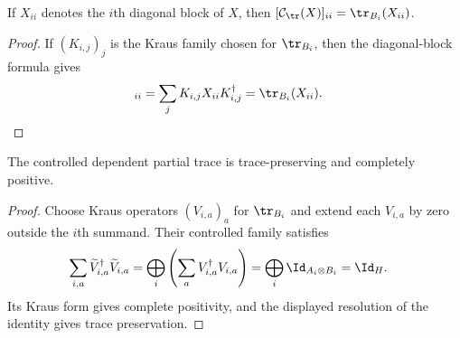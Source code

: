 \begin{theorem}
    \label{thm:controlled_dependent_partial_trace_same_block}
    \leanok
    If $X_{ii}$ denotes the $i$th diagonal block of $X$, then
    $[\mathcal C_{\tr}(X)]_{ii}=\tr_{B_i}(X_{ii})$.
\end{theorem}
\begin{proof}
    \leanok

    If $(K_{i,j})_j$ is the Kraus family chosen for $\tr_{B_i}$, then the
    diagonal-block formula gives
    \begin{align}
        [\mathcal C_{\tr}(X)]_{ii}
         & =\sum_j K_{i,j}X_{ii}K_{i,j}^\dagger
        =\tr_{B_i}(X_{ii}). \notag
    \end{align}
\end{proof}

\begin{theorem}
    \label{thm:controlled_dependent_partial_trace_cptp}
    \leanok
    The controlled dependent partial trace is trace-preserving and completely
    positive.
\end{theorem}
\begin{proof}
    \leanok

    Choose Kraus operators $(V_{i,a})_a$ for $\tr_{B_i}$ and extend each
    $V_{i,a}$ by zero outside the $i$th summand. Their controlled family
    satisfies
    \begin{align}
        \sum_{i,a}\widetilde V_{i,a}^{\dagger}\widetilde V_{i,a}
         & =\bigoplus_i\left(\sum_aV_{i,a}^{\dagger}V_{i,a}\right)
        =\bigoplus_i \Id_{A_i\otimes B_i}
        =\Id_H. \notag
    \end{align}
    Its Kraus form gives complete positivity, and the displayed resolution of
    the identity gives trace preservation.
\end{proof}
